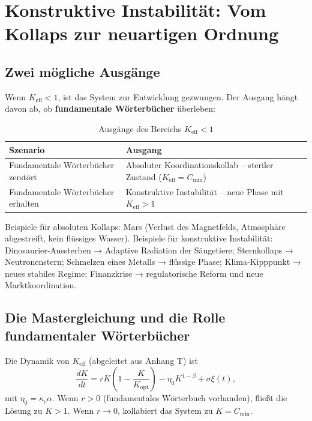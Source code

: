 \documentclass[12pt,a4paper]{article}
\newcommand{\Keff}{K_{\mathrm{eff}}}
\begin{document}
	\section{Konstruktive Instabilität: Vom Kollaps zur neuartigen Ordnung}
	
	\subsection{Zwei mögliche Ausgänge}
	
	Wenn $\Keff < 1$, ist das System zur Entwicklung gezwungen. Der Ausgang hängt davon ab,
	ob \textbf{fundamentale Wörterbücher} überleben:
	
	\begin{table}[H]
		\centering
		\caption{Ausgänge des Bereichs $\Keff < 1$}
		\begin{tabular}{p{5cm}p{8cm}}
			\toprule
			\textbf{Szenario} & \textbf{Ausgang} \\
			\midrule
			Fundamentale Wörterbücher zerstört & Absoluter Koordinationskollab – steriler Zustand ($\Keff = C_{\min}$) \\
			Fundamentale Wörterbücher erhalten & Konstruktive Instabilität – neue Phase mit $\Keff > 1$ \\
			\bottomrule
		\end{tabular}
	\end{table}
	
	Beispiele für absoluten Kollaps: Mars (Verlust des Magnetfelds, Atmosphäre abgestreift,
	kein flüssiges Wasser). Beispiele für konstruktive Instabilität: Dinosaurier‑Aussterben →
	Adaptive Radiation der Säugetiere; Sternkollaps → Neutronenstern; Schmelzen eines Metalls →
	flüssige Phase; Klima‑Kipppunkt → neues stabiles Regime; Finanzkrise → regulatorische Reform
	und neue Marktkoordination.
	
	\subsection{Die Mastergleichung und die Rolle fundamentaler Wörterbücher}
	
	Die Dynamik von $\Keff$ (abgeleitet aus Anhang T) ist
	\begin{equation}
		\frac{dK}{dt} = r K\left(1 - \frac{K}{K_{\mathrm{opt}}}\right) - \eta_0 K^{1-\beta} + \sigma \xi(t),
		\label{eq:master}
	\end{equation}
	mit $\eta_0 = \kappa_c \alpha$. Wenn $r > 0$ (fundamentales Wörterbuch vorhanden), fließt die
	Lösung zu $K > 1$. Wenn $r \to 0$, kollabiert das System zu $K = C_{\min}$.
	
\end{document}
